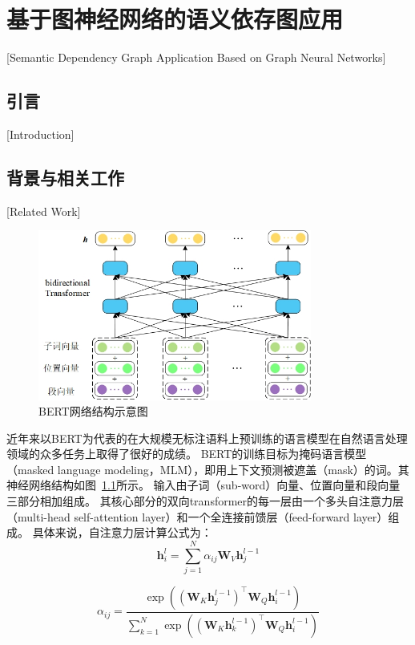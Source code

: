 
\chapter[基于图神经网络的语义依存图应用]{基于图神经网络的语义依存图应用}[Semantic Dependency Graph Application Based on Graph Neural Networks]

\section{引言}[Introduction]

\section{背景与相关工作}[Related Work]

\begin{figure}[hbtp]
	\centering
	\includegraphics[width=90mm]{figures/bert.jpg}
	\caption{BERT网络结构示意图}
	\label{fig:bert}
\end{figure}

近年来以BERT\cite{devlin2019bert}为代表的在大规模无标注语料上预训练的语言模型在自然语言处理领域的众多任务上取得了很好的成绩。
BERT的训练目标为掩码语言模型（masked language modeling，MLM），即用上下文预测被遮盖（mask）的词。其神经网络结构如图~\ref{fig:bert}所示。
输入由子词（sub-word）向量、位置向量和段向量三部分相加组成。
其核心部分的双向transformer的每一层由一个多头自注意力层（multi-head self-attention layer）和一个全连接前馈层（feed-forward layer）组成。
具体来说，自注意力层计算公式为：
\begin{equation}
\label{eq:att-sum}
\mathbf{h}_i^l = \sum_{j=1}^{N} \alpha_{ij}\mathbf{W}_V \mathbf{h}_j^{l-1}
\end{equation}

\begin{equation}
\label{eq:att-weight}
\alpha_{ij} = \frac{\exp((\mathbf{W}_K \mathbf{h}_j^{l-1})^\top\mathbf{W}_Q \mathbf{h}_i^{l-1})}{\sum_{k=1}^{N}\exp((\mathbf{W}_K \mathbf{h}_k^{l-1})^\top\mathbf{W}_Q \mathbf{h}_i^{l-1})}
\end{equation}

